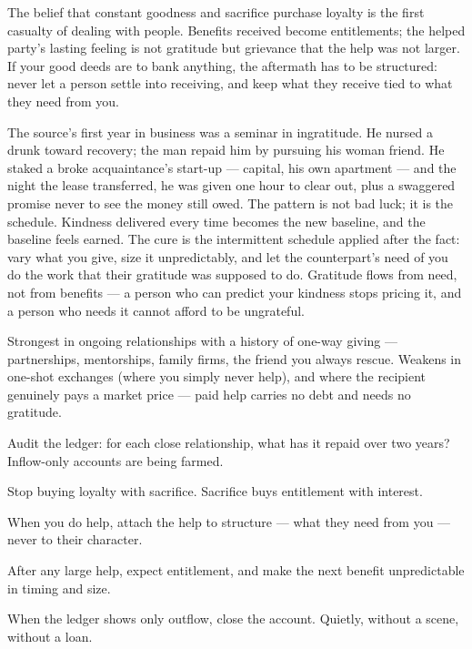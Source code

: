 \begin{core}
The belief that constant goodness and sacrifice purchase loyalty is the first casualty of dealing with people. Benefits received become entitlements; the helped party's lasting feeling is not gratitude but grievance that the help was not larger. If your good deeds are to bank anything, the aftermath has to be structured: never let a person settle into receiving, and keep what they receive tied to what they need from you.
\end{core}
\begin{mechanism}
The source's first year in business was a seminar in ingratitude. He nursed a drunk toward recovery; the man repaid him by pursuing his woman friend. He staked a broke acquaintance's start-up --- capital, his own apartment --- and the night the lease transferred, he was given one hour to clear out, plus a swaggered promise never to see the money still owed. The pattern is not bad luck; it is the schedule. Kindness delivered every time becomes the new baseline, and the baseline feels earned. The cure is the intermittent schedule applied after the fact: vary what you give, size it unpredictably, and let the counterpart's need of you do the work that their gratitude was supposed to do. Gratitude flows from need, not from benefits --- a person who can predict your kindness stops pricing it, and a person who needs it cannot afford to be ungrateful.
\end{mechanism}
\begin{conditions}
Strongest in ongoing relationships with a history of one-way giving --- partnerships, mentorships, family firms, the friend you always rescue. Weakens in one-shot exchanges (where you simply never help), and where the recipient genuinely pays a market price --- paid help carries no debt and needs no gratitude.
\end{conditions}
\begin{application}
  \item Audit the ledger: for each close relationship, what has it repaid over two years? Inflow-only accounts are being farmed.
  \item Stop buying loyalty with sacrifice. Sacrifice buys entitlement with interest.
  \item When you do help, attach the help to structure --- what they need from you --- never to their character.
  \item After any large help, expect entitlement, and make the next benefit unpredictable in timing and size.
  \item When the ledger shows only outflow, close the account. Quietly, without a scene, without a loan.
\end{application}
